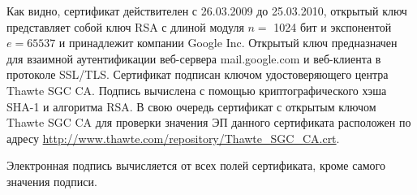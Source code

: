 Как видно, сертификат действителен с 26.03.2009 до 25.03.2010, открытый ключ представляет собой ключ RSA с длиной модуля $n=$ 1024 бит и экспонентой $e = 65537$ и принадлежит компании Google Inc. Открытый ключ предназначен для взаимной аутентификации веб-сервера mail.google.com и веб-клиента в протоколе SSL/TLS. Сертификат подписан ключом удостоверяющего центра Thawte SGC CA. Подпись вычислена с помощью криптографического хэша SHA-1 и алгоритма RSA. В свою очередь сертификат с открытым ключом Thawte SGC CA для проверки значения ЭП данного сертификата расположен по адресу \url{http://www.thawte.com/repository/Thawte\_SGC\_CA.crt}.

Электронная подпись вычисляется от всех полей сертификата, кроме самого значения подписи.
